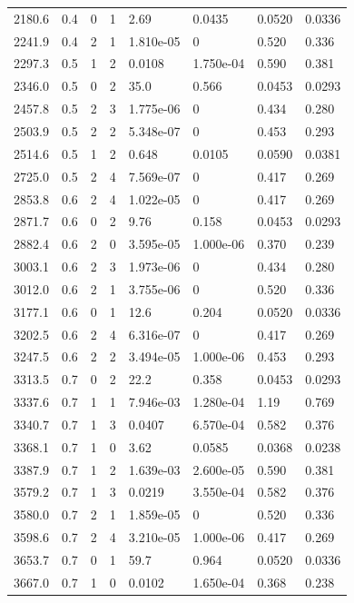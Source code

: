 \documentclass[preview]{standalone}
\begin{document}
{{{\begin{tabular}{L{1.2cm}C{1.2cm} C{0.3cm}C{0.5cm} C{1.4cm}C{1.4cm} C{1.4cm}C{1.4cm}}
  2180.6  &   0.4  & 0     &  1 &  2.69  & 0.0435  & 0.0520 &  0.0336   \\ 
  2241.9  &   0.4  & 2     &  1 &  1.810e-05  & 0  & 0.520 &  0.336   \\ 
  2297.3  &   0.5  & 1     &  2 &  0.0108  & 1.750e-04  & 0.590 &  0.381   \\ 
  2346.0  &   0.5  & 0     &  2 &  35.0  & 0.566  & 0.0453 &  0.0293   \\ 
  2457.8  &   0.5  & 2     &  3 &  1.775e-06  & 0  & 0.434 &  0.280   \\ 
  2503.9  &   0.5  & 2     &  2 &  5.348e-07  & 0  & 0.453 &  0.293   \\ 
  2514.6  &   0.5  & 1     &  2 &  0.648  & 0.0105  & 0.0590 &  0.0381   \\ 
  2725.0  &   0.5  & 2     &  4 &  7.569e-07  & 0  & 0.417 &  0.269   \\ 
  2853.8  &   0.6  & 2     &  4 &  1.022e-05  & 0  & 0.417 &  0.269   \\ 
  2871.7  &   0.6  & 0     &  2 &  9.76  & 0.158  & 0.0453 &  0.0293   \\ 
  2882.4  &   0.6  & 2     &  0 &  3.595e-05  & 1.000e-06  & 0.370 &  0.239   \\ 
  3003.1  &   0.6  & 2     &  3 &  1.973e-06  & 0  & 0.434 &  0.280   \\ 
  3012.0  &   0.6  & 2     &  1 &  3.755e-06  & 0  & 0.520 &  0.336   \\ 
  3177.1  &   0.6  & 0     &  1 &  12.6  & 0.204  & 0.0520 &  0.0336   \\ 
  3202.5  &   0.6  & 2     &  4 &  6.316e-07  & 0  & 0.417 &  0.269   \\ 
  3247.5  &   0.6  & 2     &  2 &  3.494e-05  & 1.000e-06  & 0.453 &  0.293   \\ 
  3313.5  &   0.7  & 0     &  2 &  22.2  & 0.358  & 0.0453 &  0.0293   \\ 
  3337.6  &   0.7  & 1     &  1 &  7.946e-03  & 1.280e-04  & 1.19 &  0.769   \\ 
  3340.7  &   0.7  & 1     &  3 &  0.0407  & 6.570e-04  & 0.582 &  0.376   \\ 
  3368.1  &   0.7  & 1     &  0 &  3.62  & 0.0585  & 0.0368 &  0.0238   \\ 
  3387.9  &   0.7  & 1     &  2 &  1.639e-03  & 2.600e-05  & 0.590 &  0.381   \\ 
  3579.2  &   0.7  & 1     &  3 &  0.0219  & 3.550e-04  & 0.582 &  0.376   \\ 
  3580.0  &   0.7  & 2     &  1 &  1.859e-05  & 0  & 0.520 &  0.336   \\ 
  3598.6  &   0.7  & 2     &  4 &  3.210e-05  & 1.000e-06  & 0.417 &  0.269   \\ 
  3653.7  &   0.7  & 0     &  1 &  59.7  & 0.964  & 0.0520 &  0.0336   \\ 
  3667.0  &   0.7  & 1     &  0 &  0.0102  & 1.650e-04  & 0.368 &  0.238   \\ 
\hline 
\end{tabular} 

}}}
\end{document}
